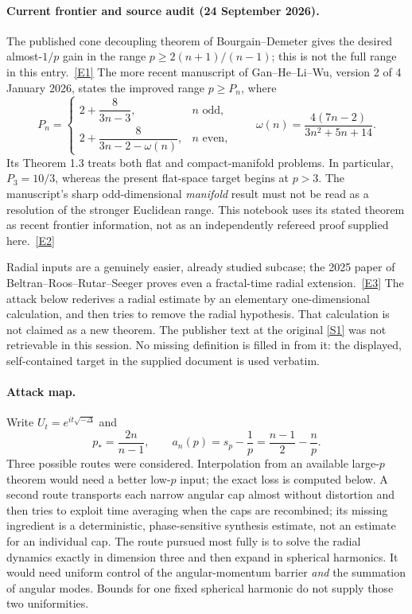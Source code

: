 \documentclass[11pt]{article}
\newcommand{\sref}[2]{\hyperlink{source:#1:#2}{[S#2]}}
\newcommand{\eref}[2]{\hyperlink{extra:#1:#2}{[E#2]}}
\begin{document}
	\paragraph{Current frontier and source audit (24 September 2026).}
	The published cone decoupling theorem of Bourgain--Demeter gives the desired
	almost-$1/p$ gain in the range $p\geq 2(n+1)/(n-1)$; this is not the full
	range in this entry.\ \eref{201}{1}
	The more recent manuscript of Gan--He--Li--Wu, version 2 of 4 January 2026,
	states the improved range $p\geq P_n$, where
	\begin{equation}\label{ra201:frontier}
		P_n=\begin{cases}
			2+\dfrac{8}{3n-3},&n\text{ odd},\\[4pt]
			2+\dfrac{8}{3n-2-\omega(n)},&n\text{ even},
		\end{cases}
		\qquad \omega(n)=\frac{4(7n-2)}{3n^2+5n+14}.
	\end{equation}
	Its Theorem 1.3 treats both flat and compact-manifold problems. In particular,
	$P_3=10/3$, whereas the present flat-space target begins at $p>3$.
	The manuscript's sharp odd-dimensional \emph{manifold} result must not be
	read as a resolution of the stronger Euclidean range. This notebook uses
	its stated theorem as recent frontier information, not as an independently
	refereed proof supplied here.\ \eref{201}{2}
	
	Radial inputs are a genuinely easier, already studied subcase; the 2025
	paper of Beltran--Roos--Rutar--Seeger proves even a fractal-time radial
	extension.\ \eref{201}{3} The attack below rederives a radial estimate by
	an elementary one-dimensional calculation, and then tries to remove the
	radial hypothesis. That calculation is not claimed as a new theorem.
	The publisher text at the original \sref{201}{1} was not retrievable in
	this session. No missing definition is filled in from it: the displayed,
	self-contained target in the supplied document is used verbatim.
	
	\paragraph{Attack map.}
	Write $U_t=e^{it\sqrt{-\Delta}}$ and
	\[
	p_* =\frac{2n}{n-1},\qquad
	a_n(p)=s_p-\frac1p=\frac{n-1}{2}-\frac np.
	\]
	Three possible routes were considered. Interpolation from an available
	large-$p$ theorem would need a better low-$p$ input; the exact loss is
	computed below. A second route transports each narrow angular cap almost
	without distortion and then tries to exploit time averaging when the caps
	are recombined; its missing ingredient is a deterministic, phase-sensitive
	synthesis estimate, not an estimate for an individual cap. The route
	pursued most fully is to solve the radial dynamics exactly in dimension
	three and then expand in spherical harmonics. It would need uniform
	control of the angular-momentum barrier \emph{and} the summation of angular
	modes. Bounds for one fixed spherical harmonic do not supply those two
	uniformities.
	
\end{document}
